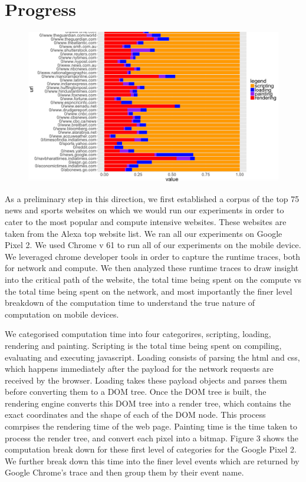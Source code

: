 \section{Progress}
\label{sec:Progress}


\begin{figure}[t!]
\centering
\includegraphics[width=0.99\columnwidth, scale=2.0]{figs/comp_1.png}
\label{fig:act_p2}
\end{figure}

As a preliminary step in this direction, we first established a corpus of the top
75 news and sports websites on which we would run our experiments
in order to cater to the most popular and compute intensive websites. 
These websites are taken from the Alexa top website list.
We ran all our experiments on Google Pixel 2. We used Chrome v 61 to run all of our experiments on the mobile device. We leveraged chrome developer tools in order
to capture the runtime traces, both for network and compute. We then analyzed these runtime
traces to draw insight into the critical path of the website, the total time being spent on the 
compute vs the total time being spent on the network, and most importantly the finer
level breakdown of the computation time to understand the true nature of computation on mobile
devices. 

We categorised computation time into four categorires, scripting, loading, rendering and
painting. Scripting is the total time being spent on
compiling, evaluating and executing javascript. Loading consists of parsing the html and css, which happens 
immediately after the payload for the network requests are received by the browser. Loading
takes these payload objects and parses them before converting them to a DOM tree. Once the DOM tree is built,
the rendering engine converts this DOM tree into a render tree, which contains the
exact coordinates and the shape of each of the DOM node. This process comrpises the rendering time of the web page.
Painting time is the time taken to process the render tree, and convert
each pixel into a bitmap.
Figure 3 shows the computation break down for these first level of categories
for the Google Pixel 2. We further break down this time into the finer level events
which are returned by Google Chrome's trace and then group them by their event name.

